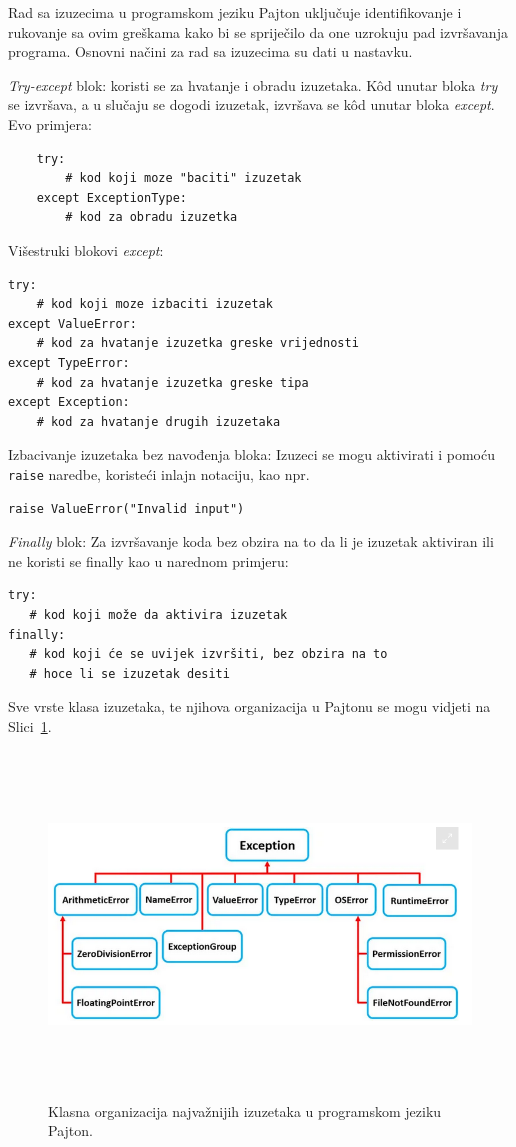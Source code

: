 Rad sa izuzecima u programskom jeziku Pajton uključuje identifikovanje i rukovanje sa ovim greškama kako bi se spriječilo da one uzrokuju pad izvršavanja programa. Osnovni  načini za rad sa izuzecima su dati u nastavku.

\textit{Try-except }blok: koristi se za hvatanje i obradu izuzetaka. K\^od unutar bloka \textit{try} se izvršava, a u slučaju se dogodi izuzetak, izvršava se k\^od unutar bloka \textit{except}. Evo primjera:
\begin{verbatim}
	try:
	    # kod koji moze "baciti" izuzetak
	except ExceptionType:
	    # kod za obradu izuzetka
\end{verbatim}
Višestruki blokovi \textit{except}:  
\begin{verbatim}
try:
    # kod koji moze izbaciti izuzetak
except ValueError:
    # kod za hvatanje izuzetka greske vrijednosti
except TypeError:
    # kod za hvatanje izuzetka greske tipa
except Exception:
    # kod za hvatanje drugih izuzetaka
\end{verbatim}
Izbacivanje izuzetaka bez   navođenja bloka: Izuzeci se mogu aktivirati i pomoću   \texttt{raise} naredbe, koristeći inlajn notaciju, kao npr.
\begin{verbatim}
raise ValueError("Invalid input")
\end{verbatim}
\textit{Finally} blok: Za izvršavanje koda bez obzira na to da li je izuzetak aktiviran ili ne koristi se finally kao u narednom primjeru:
\begin{verbatim}
try:
   # kod koji može da aktivira izuzetak
finally:
   # kod koji će se uvijek izvršiti, bez obzira na to
   # hoce li se izuzetak desiti
\end{verbatim}

Sve vrste klasa izuzetaka, te njihova organizacija u Pajtonu se mogu vidjeti na Slici~\ref{fig: exceptions}.  
\begin{figure}[H]
	\centering
	\includegraphics[width=400pt,height=260pt]{slike/class-exceptions.png}
	\caption{Klasna organizacija najvažnijih izuzetaka u programskom jeziku Pajton.}
	\label{fig: exceptions}
\end{figure}

